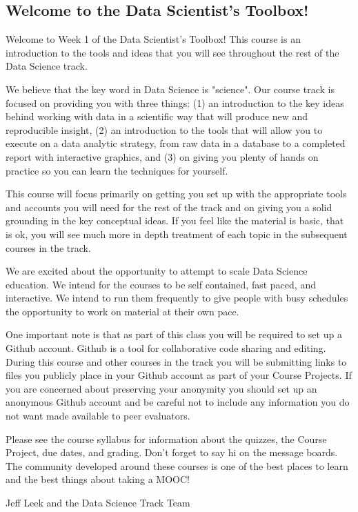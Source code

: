\documentclass[DSS1.tex]{subfiles}
\begin{document}
 
\subsection{ Welcome to the Data Scientist's Toolbox!}

Welcome to Week 1 of the Data Scientist's Toolbox! This course is an introduction to the tools and ideas that you will see throughout the rest of the Data Science track. 

We believe that the key word in Data Science is "science". Our course track is focused on providing you with three things: (1) an introduction to the key ideas behind working with data in a scientific way that will produce new and reproducible insight, (2) an introduction to the tools that will allow you to execute on a data analytic strategy, from raw data in a database to a completed report with interactive graphics, and (3) on giving you plenty of hands on practice so you can learn the techniques for yourself. 

This course will focus primarily on getting you set up with the appropriate tools and accounts you will need for the rest of the track and on giving you a solid grounding in the key conceptual ideas. If you feel like the material is basic, that is ok, you will see much more in depth treatment of each topic in the subsequent courses in the track. 

We are excited about the opportunity to attempt to scale Data Science education. We intend for the courses to be self contained, fast paced, and interactive. We intend to run them frequently to give people with busy schedules the opportunity to work on material at their own pace. 

One important note is that as part of this class you will be required to set up a Github account. Github is a tool for collaborative code sharing and editing. During this course and other courses in the track you will be submitting links to files you publicly place in your Github account as part of your Course Projects. If you are concerned about preserving your anonymity you should set up an anonymous Github account and be careful not to include any information you do not want made available to peer evaluators.

Please see the course syllabus for information about the quizzes, the Course Project, due dates, and grading. Don't forget to say hi on the message boards. The community developed around these courses is one of the best places to learn and the best things about taking a MOOC! 

Jeff Leek and the Data Science Track Team

\end{document}

